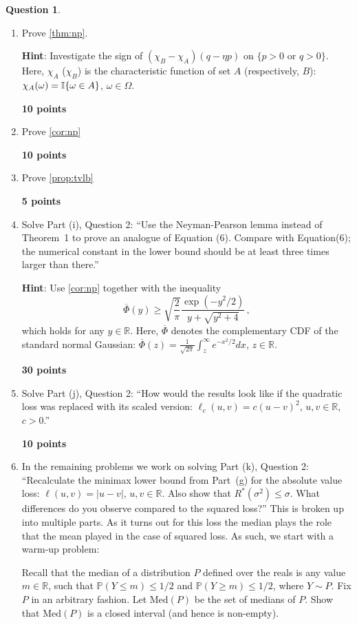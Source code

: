 \documentclass{article}
\newcommand{\R}{\mathbb{R}}
\DeclareMathOperator*{\1}{\mathbbm{1}}
\newcommand{\Prob}[1]{\mathbb{P}( #1 )}
\newcounter{DocPoints}
\newcounter{QuestionPoints}
\newcommand{\points}[1]{	\par\mbox{}\par\noindent\hfill {\bf #1 points}	\addtocounter{DocPoints}{#1}
	\addtocounter{QuestionPoints}{#1}
}
\theoremstyle{definition}
\newtheorem{question}{Question}
\theoremstyle{remark}
\newcommand{\hint}{\noindent \textbf{Hint}:\xspace}
\begin{document}
\begin{question}
\mbox{}

\begin{enumerate}[(Q1)]

\item Prove \cref{thm:np}.

\hint 
Investigate the sign of $(\chi_B - \chi_A)(q-\eta p)$ on $\{p>0 \text{ or } q>0\}$. Here, 
$\chi_A$ ($\chi_B$) is the characteristic function of set $A$ (respectively, $B$): $\chi_A(\omega) = \mathbb{I}\{\omega\in A\}$, $\omega\in \Omega$.

\points{10}

\item Prove \cref{cor:np}
\points{10}

\item Prove \cref{prop:tvlb}

\points{5}

\item Solve Part (i), Question 2: 
``Use the Neyman-Pearson lemma instead of Theorem~1 
to prove an analogue of Equation (6).
Compare with Equation(6); the numerical constant in the lower bound should be at least three times larger than there.''

\hint
Use \cref{cor:np} together with the inequality
\[
\overline\Phi(y) \ge \sqrt{\frac{2}{\pi}} \frac{\exp(-y^2/2)}{y + \sqrt{y^2+4}}\,,
\]
which holds for any $y\in \R$. 
Here,  $\overline\Phi$ denotes the complementary CDF of the standard normal Gaussian:
$\overline\Phi(z) = \frac{1}{\sqrt{2\pi}} \int_z^\infty e^{-x^2/2} dx$, $z\in \R$.
\points{30}

\item  Solve Part (j), Question 2: 
``How would the results look like if the quadratic loss was replaced with its scaled version:
$\ell_c(u,v) = c (u-v)^2$, $u,v\in \R$, $c>0$.''

\points{10}

\item  In the remaining problems we work on solving Part (k), Question 2:  ``Recalculate the minimax lower bound 
from Part~(g) for the
absolute value loss: $\ell(u,v) = |u-v|$, $u,v\in \R$.
Also show that $R^*(\sigma^2) \le \sigma$.
What differences do you observe compared to the squared loss?''
This is broken up into multiple parts. As it turns out for this loss the median plays the role that the mean played in the case of squared loss. As such, we start with a warm-up problem:

Recall that the median of a distribution $P$ defined over the reals is any value $m\in \R$, such that $\Prob{Y\le m}\le 1/2$ and $\Prob{Y\ge m}\le 1/2$, where $Y\sim P$.
Fix $P$ in an arbitrary fashion. Let $\text{Med}(P)$ be the set of medians of $P$. Show that $\text{Med}(P)$ is a closed interval (and hence is non-empty).


\end{enumerate}
\end{question}
\end{document}
